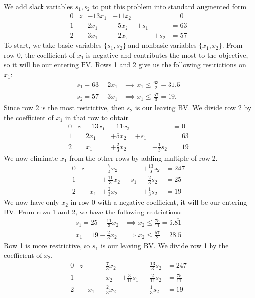 \documentclass[12pt]{article}
\theoremstyle{definition}
\begin{document}
We add slack variables $s_1, s_2$ to put this problem into standard augmented form
\[\begin{array}{rrrrrrl}
    0 & z & -13x_1 & - 11x_2 & & & = 0\\
    1 &   & 2x_1 & +5x_2 & +s_1 & & = 63 \\
    2 &   & 3x_1 & +2x_2 & & +s_2 & = 57
\end{array}\]
To start, we take basic variables $\{s_1, s_2\}$ and nonbasic variables $\{x_1, x_2\}$. From row 0, the coefficient of $x_1$ is negative and contributes the most to the objective, so it will be our entering BV. Rows 1 and 2 give us the following restrictions on $x_1$:
\begin{align*}
    s_1 = 63 - 2x_1 &\implies x_1 \leq \frac{63}{2} = 31.5\\
    s_2 = 57 - 3x_1 &\implies x_1 \leq \frac{57}{3} = 19.
\end{align*}
Since row 2 is the most restrictive, then $s_2$ is our leaving BV. We divide row 2 by the coefficient of $x_1$ in that row to obtain
\[\begin{array}{rrrrrrl}
    0 & z & -13x_1 & - 11x_2 & & & = 0\\
    1 &   & 2x_1 & +5x_2 & +s_1 & & = 63 \\
    2 &   & x_1 & +\frac23 x_2 & & +\frac13 s_2 & = 19
\end{array}\]
We now eliminate $x_1$ from the other rows by adding multiple of row 2.
\[\begin{array}{rrrrrrl}
    0 & z &  & -\frac73 x_2 & & +\frac{13}{3}s_2 & = 247 \\
    1 &   &  & +\frac{11}{3}x_2 & +s_1 & -\frac{2}{3}s_2 & = 25 \\
    2 &   & x_1 & +\frac23 x_2 & & +\frac13 s_2 & = 19
\end{array}\]
We now have only $x_2$ in row 0 with a negative coefficient, it will be our entering BV. From rows 1 and 2, we have the following restrictions:
\begin{align*}
    s_1 = 25 - \frac{11}{3}x_2 &\implies x_2 \leq \frac{75}{11} = 6.\overline{81} \\
    x_1 = 19 - \frac23x_2 &\implies x_2 \leq \frac{57}{2} = 28.5
\end{align*}
Row 1 is more restrictive, so $s_1$ is our leaving BV. We divide row 1 by the coefficient of $x_2$.
\[\begin{array}{rrrrrrl}
    0 & z &  & -\frac73 x_2 & & +\frac{13}{3}s_2 & = 247 \\
    1 &   &  & +x_2 & +\frac{3}{11}s_1 & -\frac{2}{11}s_2 & = \frac{75}{11} \\
    2 &   & x_1 & +\frac23 x_2 & & +\frac13 s_2 & = 19
\end{array}\]
\end{document}
